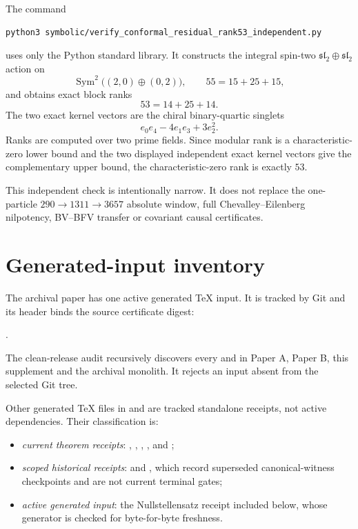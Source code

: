 \documentclass[11pt]{article}
\begin{document}
The command
\begin{verbatim}
python3 symbolic/verify_conformal_residual_rank53_independent.py
\end{verbatim}
uses only the Python standard library.  It constructs the integral spin-two
$\mathfrak{sl}_2\oplus\mathfrak{sl}_2$ action on
\[
 \operatorname{Sym}^2\bigl((2,0)\oplus(0,2)\bigr),
 \qquad 55=15+25+15,
\]
and obtains exact block ranks
\[
 53=14+25+14.
\]
The two exact kernel vectors are the chiral binary-quartic singlets
\[
 e_0e_4-4e_1e_3+3e_2^2.
\]
Ranks are computed over two prime fields.  Since modular rank is a
characteristic-zero lower bound and the two displayed independent exact
kernel vectors give the complementary upper bound, the characteristic-zero
rank is exactly $53$.

This independent check is intentionally narrow.  It does not replace the
one-particle $290\to1311\to3657$ absolute window, full Chevalley--Eilenberg
nilpotency, BV--BFV transfer or covariant causal certificates.

\section{Generated-input inventory}

The archival paper has one active generated TeX input.  It is tracked by Git
and its header binds the source certificate digest:
\begin{center}
.
\end{center}
The clean-release audit recursively discovers every \verb|| and
\verb|| in Paper A, Paper B, this supplement and the archival
monolith.  It rejects an input absent from the selected Git tree.

Other generated TeX files in  and
 are tracked standalone receipts, not
active \verb|| dependencies.  Their classification is:
\begin{itemize}
\item \emph{current theorem receipts}: ,
  , ,
  , and ;
\item \emph{scoped historical receipts}: 
  and , which record superseded
  canonical-witness checkpoints and are not current terminal gates;
\item \emph{active generated input}: the Nullstellensatz receipt included
  below, whose generator is checked for byte-for-byte freshness.
\end{itemize}
\end{document}
